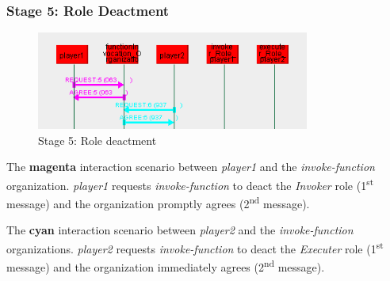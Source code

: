 \subsubsection*{Stage 5: Role Deactment}

\begin{figure}[H]
	\centering
	\includegraphics[width=0.8\textwidth]{images/examples/example1-stage5.png}
	\caption{Stage 5: Role deactment}
	\label{figure:example1-stage5}
\end{figure} 

The \textbf{magenta} interaction scenario between \textit{player1} and the \textit{invoke-function} organization.
\textit{player1} requests \textit{invoke-function} to deact the \textit{Invoker} role (1\textsuperscript{st} message) and the organization promptly agrees (2\textsuperscript{nd} message).

The \textbf{cyan} interaction scenario between \textit{player2} and the \textit{invoke-function} organizations.
\textit{player2} requests \textit{invoke-function} to deact the \textit{Executer} role (1\textsuperscript{st} message) and the organization immediately agrees (2\textsuperscript{nd} message).